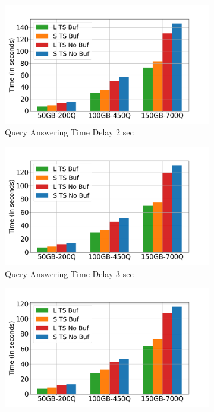 \begin{figure}
	\centering
	\begin{subfigure}[c]{0.45\textwidth}
		\includegraphics[width=1\textwidth]   {figures/Experiments/Dynamic/xAxis/x_axis_delay[2].png}
		\caption{Query Answering Time Delay 2 sec}
		\label{fig:QA-xAxis-delay-2}
	\end{subfigure}
	\begin{subfigure}[c]{0.45\textwidth}
		\includegraphics[width=1\textwidth]   {figures/Experiments/Dynamic/xAxis/x_axis_delay[3].png}
		\caption{Query Answering Time Delay 3 sec}
		\label{fig:QA-xAxis-delay-3}
	\end{subfigure}
	\begin{subfigure}[c]{0.45\textwidth}
		\includegraphics[width=1\textwidth]   {figures/Experiments/Dynamic/xAxis/x_axis_delay[5].png}

\end{subfigure}
\end{figure}
